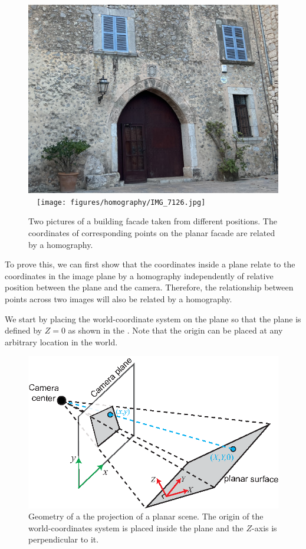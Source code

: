 \begin{figure}
    \centerline{
        \includegraphics[width=0.45\linewidth]{figures/homography/IMG_7127_crop.jpg}
        ~~\texttt{[image: figures/homography/IMG\_7126.jpg]}
    }
    \caption{Two pictures of a building facade taken from different positions. The coordinates of corresponding points on the planar facade are related by a homography.}
    \label{fig:example_two_images_facade}
\end{figure}


To prove this, we can first show that the coordinates inside a plane relate to the coordinates in the image plane by a homography independently of relative position between the plane and the camera. Therefore, the relationship between points across two images will also be related by a homography.



We start by placing the world-coordinate system on the plane so that the plane is defined by $Z=0$ as shown in the \fig{\ref{fig:homography_plane_geometry}}. Note that the origin can be placed at any arbitrary location in the world.


\begin{figure}
    \centerline{
        \includegraphics[width=0.7\linewidth]{figures/homography/homography_plane_geometry2.eps}
    }
    \caption{Geometry of a the projection of a planar scene. The origin of the world-coordinates system is placed inside the plane and the $Z$-axis is perpendicular to it.}
    \label{fig:homography_plane_geometry}
\end{figure}


